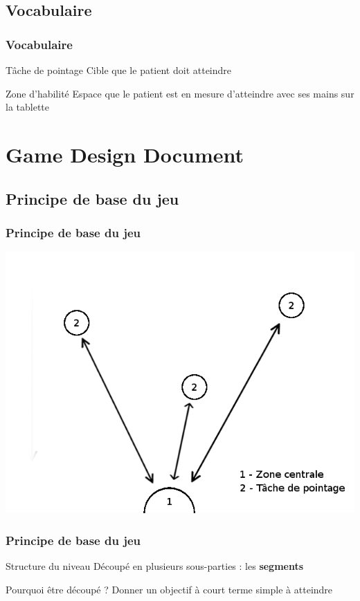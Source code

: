 \documentclass{beamer}
\begin{document}
\subsection{Vocabulaire}

\begin{frame}
\frametitle{Vocabulaire}

\begin{block}{Tâche de pointage}
Cible que le patient doit atteindre
\end{block}

\begin{block}{Zone d'habilité}
Espace que le patient est en mesure d'atteindre avec ses mains sur la tablette
\end{block}

\end{frame}

\section{Game Design Document}

\subsection{Principe de base du jeu}

\begin{frame}
\frametitle{Principe de base du jeu}
\includegraphics[scale=0.4]{images/gameplay.png}
\end{frame}

\begin{frame}
\frametitle{Principe de base du jeu}

\begin{block}{Structure du niveau}
	Découpé en plusieurs sous-parties : les \textbf{segments}
\end{block}
\pause
\begin{block}{Pourquoi être découpé ?}
Donner un objectif à court terme simple à atteindre 
\end{block}

\end{frame}
\end{document}
